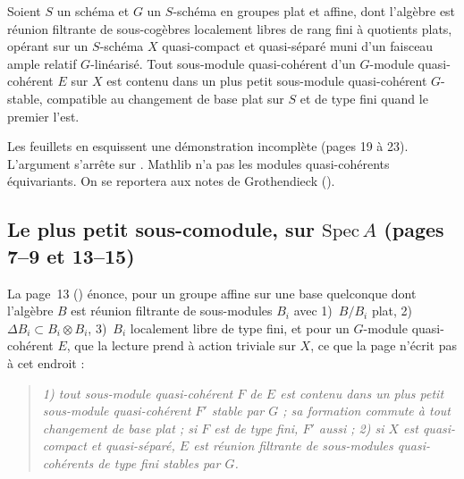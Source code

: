 \begin{encadre}
\begin{theoreme*}\nonverifie
Soient $S$ un schéma et $G$ un $S$-schéma en groupes plat et affine, dont l'algèbre est réunion filtrante de sous-cogèbres localement libres de rang fini à quotients plats, opérant sur un $S$-schéma $X$ quasi-compact et quasi-séparé muni d'un faisceau ample relatif $G$-linéarisé. Tout sous-module quasi-cohérent d'un $G$-module quasi-cohérent $E$ sur $X$ est contenu dans un plus petit sous-module quasi-cohérent $G$-stable, compatible au changement de base plat sur $S$ et de type fini quand le premier l'est.
\end{theoreme*}
\end{encadre}
{\small Les feuillets en esquissent une démonstration incomplète (pages 19 à 23). L'argument s'arrête sur . Mathlib n'a pas les modules quasi-cohérents équivariants. On se reportera aux notes de Grothendieck ().\par}

\subsection*{Le plus petit sous-comodule, sur $\mathrm{Spec}\,A$ (pages 7--9 et 13--15)\protect{}}\label{sec:90-comodules}

La page~13 () énonce, pour un groupe affine sur une base quelconque dont l'algèbre $B$ est réunion filtrante de sous-modules $B_i$ avec 1)~$B/B_i$ plat, 2)~$\Delta B_i \subset B_i \otimes B_i$, 3)~$B_i$ localement libre de type fini, et pour un $G$-module quasi-cohérent $E$, que la lecture prend à action triviale sur $X$, ce que la page n'écrit pas à cet endroit :

\begin{quote}
\emph{1) tout sous-module quasi-cohérent $F$ de $E$ est contenu dans un plus petit sous-module quasi-cohérent $F'$ stable par $G$ ; sa formation commute à tout changement de base plat ; si $F$ est de type fini, $F'$ aussi ; 2) si $X$ est quasi-compact et quasi-séparé, $E$ est réunion filtrante de sous-modules quasi-cohérents de type fini stables par $G$.}
\end{quote}

